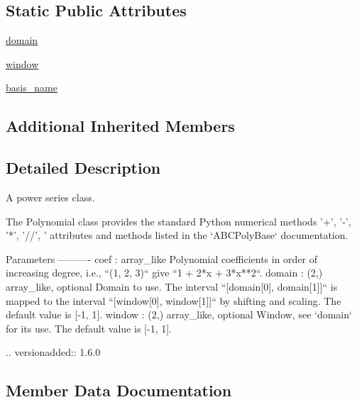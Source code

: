 \subsection*{Static Public Attributes}
\begin{DoxyCompactItemize}
\item 
\hyperlink{classnumpy_1_1polynomial_1_1polynomial_1_1Polynomial_ade1673f8a7b34480d6d6f98bcc61d034}{domain}
\item 
\hyperlink{classnumpy_1_1polynomial_1_1polynomial_1_1Polynomial_adb4c184e3034e6a051fafd00ba149989}{window}
\item 
\hyperlink{classnumpy_1_1polynomial_1_1polynomial_1_1Polynomial_a3814f820c9d1ed2a60ed82ca50f9323c}{basis\+\_\+name}
\end{DoxyCompactItemize}
\subsection*{Additional Inherited Members}


\subsection{Detailed Description}
\begin{DoxyVerb}A power series class.

The Polynomial class provides the standard Python numerical methods
'+', '-', '*', '//', '%
attributes and methods listed in the `ABCPolyBase` documentation.

Parameters
----------
coef : array_like
    Polynomial coefficients in order of increasing degree, i.e.,
    ``(1, 2, 3)`` give ``1 + 2*x + 3*x**2``.
domain : (2,) array_like, optional
    Domain to use. The interval ``[domain[0], domain[1]]`` is mapped
    to the interval ``[window[0], window[1]]`` by shifting and scaling.
    The default value is [-1, 1].
window : (2,) array_like, optional
    Window, see `domain` for its use. The default value is [-1, 1].

    .. versionadded:: 1.6.0\end{DoxyVerb}
 

\subsection{Member Data Documentation}
\mbox{\label{classnumpy_1_1polynomial_1_1polynomial_1_1Polynomial_a3814f820c9d1ed2a60ed82ca50f9323c}} 
